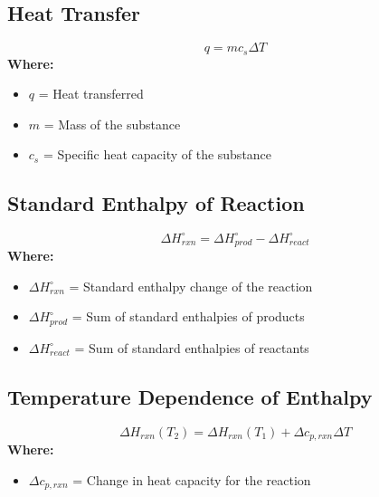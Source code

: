 \documentclass{report}
\begin{document}
\subsection*{Heat Transfer}
\[
q = m c_s \Delta T
\]
\textbf{Where:}
\begin{itemize}
    \item $q$ = Heat transferred
    \item $m$ = Mass of the substance
    \item $c_s$ = Specific heat capacity of the substance
\end{itemize}

\subsection*{Standard Enthalpy of Reaction}
\[
\Delta H^\circ_{rxn} = \Delta H^\circ_{prod} - \Delta H^\circ_{react}
\]
\textbf{Where:}
\begin{itemize}
    \item $\Delta H^\circ_{rxn}$ = Standard enthalpy change of the reaction
    \item $\Delta H^\circ_{prod}$ = Sum of standard enthalpies of products
    \item $\Delta H^\circ_{react}$ = Sum of standard enthalpies of reactants
\end{itemize}

\subsection*{Temperature Dependence of Enthalpy}
\[
\Delta H_{rxn}(T_2) = \Delta H_{rxn}(T_1) + \Delta c_{p,rxn} \Delta T
\]
\textbf{Where:}
\begin{itemize}
    \item $\Delta c_{p,rxn}$ = Change in heat capacity for the reaction
\end{itemize}
\end{document}
